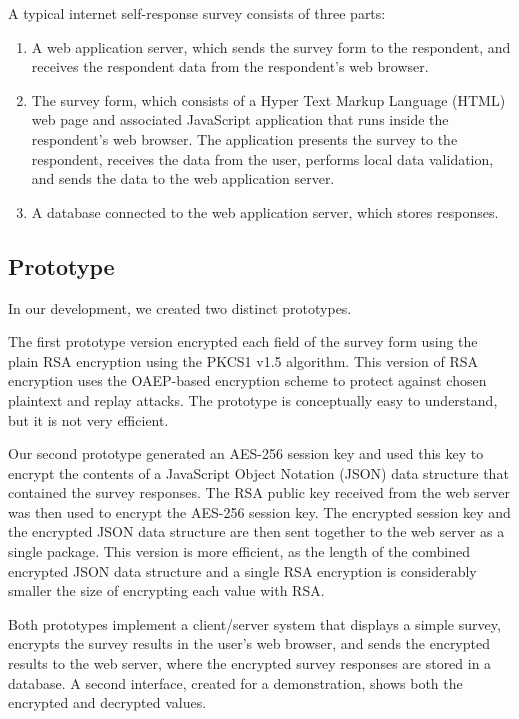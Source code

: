 \documentclass[fleqn,12pt]{wlscirep}
\begin{document}
A typical internet self-response survey consists of three parts:

\begin{enumerate}
  \item A web application server, which sends the survey form to
    the respondent, and receives the respondent data from the
    respondent's web browser.
  \item The survey form, which consists of a Hyper Text Markup
    Language (HTML) web page and associated JavaScript application
    that runs inside the respondent's web browser. The application
    presents the survey to the respondent, receives the data from the user, performs
    local data validation, and sends the data to the web application
    server.
  \item A database connected to the web application server, which stores responses.
\end{enumerate}

\subsection{Prototype}
In our development, we created two distinct prototypes.

The first prototype version encrypted each field of the survey form
using the plain RSA encryption using the PKCS1 v1.5
algorithm. This version of RSA encryption uses the OAEP-based
encryption scheme to protect against chosen plaintext and replay
attacks. The prototype is conceptually easy to understand, but it is not very efficient. 

Our second prototype generated an AES-256 session key and used this
key to encrypt the contents of a JavaScript Object Notation (JSON) data structure that contained
the survey responses. The RSA public key received from the web server
was then used to encrypt the AES-256 session key. The encrypted
session key and the encrypted JSON data structure are then sent
together to the web server as a single package. This version is more
efficient, as the length of the combined encrypted JSON data structure and a
single RSA encryption is considerably smaller the size of encrypting
each value with RSA.

Both prototypes implement a client/server system that displays a
simple survey, encrypts the survey results in the user's web browser,
and sends the encrypted results to the web server, where the encrypted
survey responses are stored in a database. A second interface, created
for a demonstration, shows both the encrypted and decrypted values.
\end{document}
